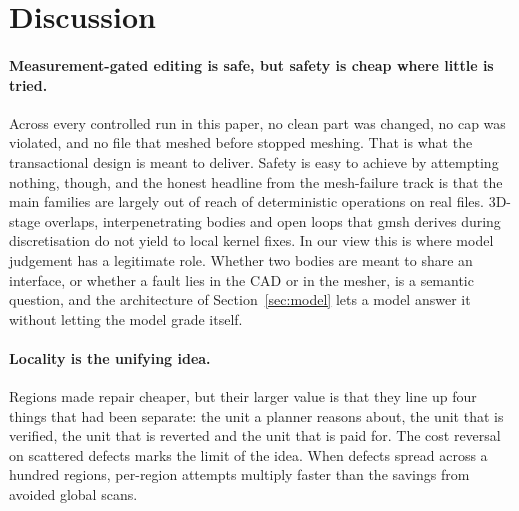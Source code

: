 \documentclass[11pt,onecolumn]{article}
\begin{document}
\section{Discussion}\label{sec:discussion}

\paragraph{Measurement-gated editing is safe, but safety is cheap where little is tried.}
Across every controlled run in this paper, no clean part was changed, no cap was violated, and no
file that meshed before stopped meshing. That is what the transactional design is meant to deliver.
Safety is easy to achieve by attempting nothing, though, and the honest headline from the
mesh-failure track is that the main families are largely out of reach of deterministic operations on
real files. 3D-stage overlaps, interpenetrating bodies and open loops that gmsh derives during
discretisation do not yield to local kernel fixes. In our view this is where model judgement has a
legitimate role. Whether two bodies are meant to share an interface, or whether a fault lies in the
CAD or in the mesher, is a semantic question, and the architecture of Section~\ref{sec:model} lets a
model answer it without letting the model grade itself.

\paragraph{Locality is the unifying idea.}
Regions made repair cheaper, but their larger value is that they line up four things that had been
separate: the unit a planner reasons about, the unit that is verified, the unit that is reverted and
the unit that is paid for. The cost reversal on scattered defects marks the limit of the idea. When
defects spread across a hundred regions, per-region attempts multiply faster than the savings from
avoided global scans.
\end{document}

